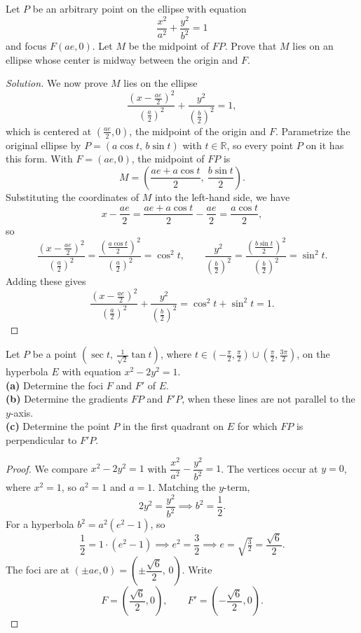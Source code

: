 \begin{tcolorbox}[title=Problem 8, breakable]
    Let $P$ be an arbitrary point on the ellipse with equation
    \[\frac{x^2}{a^2} + \frac{y^2}{b^2} = 1\]
    and focus $F(ae, 0)$. Let $M$ be the midpoint of $FP$. Prove that $M$ lies on an
    ellipse whose center is midway between the origin and $F$.
\end{tcolorbox}
\begin{proof}[Solution]
    We now prove $M$ lies on the ellipse
    \[\frac{\left(x - \tfrac{ae}{2}\right)^2}{\left(\tfrac{a}{2}\right)^2}
    + \frac{y^2}{\left(\tfrac{b}{2}\right)^2} = 1,\]
    which is centered at $\left(\tfrac{ae}{2}, 0\right)$, the midpoint of the origin and $F$.
    Parametrize the original ellipse by $P = (a\cos t,\, b\sin t)$ with $t \in \mathbb{R}$,
    so every point $P$ on it has this form. With $F = (ae, 0)$, the midpoint of $FP$ is
    \[M = \left(\frac{ae + a\cos t}{2},\ \frac{b\sin t}{2}\right).\]
    Substituting the coordinates of $M$ into the left-hand side, we have
    \[x - \frac{ae}{2} = \frac{ae + a\cos t}{2} - \frac{ae}{2} = \frac{a\cos t}{2},\]
    so
    \[\frac{\left(x - \tfrac{ae}{2}\right)^2}{\left(\tfrac{a}{2}\right)^2}
    = \frac{\left(\tfrac{a\cos t}{2}\right)^2}{\left(\tfrac{a}{2}\right)^2} = \cos^2 t,
    \qquad
    \frac{y^2}{\left(\tfrac{b}{2}\right)^2}
    = \frac{\left(\tfrac{b\sin t}{2}\right)^2}{\left(\tfrac{b}{2}\right)^2} = \sin^2 t.\]
    Adding these gives
    \[\frac{\left(x - \tfrac{ae}{2}\right)^2}{\left(\tfrac{a}{2}\right)^2}
    + \frac{y^2}{\left(\tfrac{b}{2}\right)^2} = \cos^2 t + \sin^2 t = 1.\]
\end{proof}

\newpage
\begin{tcolorbox}[title=Problem 9, breakable]
    Let $P$ be a point $\left(\sec t,\ \tfrac{1}{\sqrt{2}}\tan t\right)$, where
    $t \in \left(-\tfrac{\pi}{2}, \tfrac{\pi}{2}\right) \cup \left(\tfrac{\pi}{2}, \tfrac{3\pi}{2}\right)$,
    on the hyperbola $E$ with equation $x^2 - 2y^2 = 1$.
    \\[2pt]
    \textbf{(a)} Determine the foci $F$ and $F'$ of $E$.\\
    \textbf{(b)} Determine the gradients $FP$ and $F'P$, when these lines are not parallel to the $y$-axis.\\
    \textbf{(c)} Determine the point $P$ in the first quadrant on $E$ for which $FP$ is perpendicular to $F'P$.
\end{tcolorbox}

\begin{proof}
    We compare $x^2 - 2y^2 = 1$ with
    $\dfrac{x^2}{a^2} - \dfrac{y^2}{b^2} = 1$. The vertices occur at $y = 0$, where
    $x^2 = 1$, so $a^2 = 1$ and $a = 1$. Matching the $y$-term,
    \[2y^2 = \frac{y^2}{b^2} \implies b^2 = \frac{1}{2}.\]
    For a hyperbola $b^2 = a^2(e^2 - 1)$, so
    \[\frac{1}{2} = 1\cdot(e^2 - 1) \implies e^2 = \frac{3}{2}
    \implies e = \sqrt{\tfrac{3}{2}} = \frac{\sqrt{6}}{2}.\]
    The foci are at $(\pm ae, 0) = \left(\pm\dfrac{\sqrt{6}}{2},\, 0\right)$. Write
    \[F = \left(\frac{\sqrt{6}}{2}, 0\right), \qquad F' = \left(-\frac{\sqrt{6}}{2}, 0\right).\]
\end{proof}

